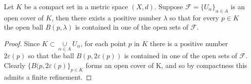\documentclass{article}
\begin{document}
\thm Let $K$ be a compact set in a metric space $(X,d)$. Suppose $\mathcal{F}=\{U_\alpha\}_{\alpha \in A}$ is an open cover of $K$, then there exists a positive number $\lambda$ so that for every $p \in K$ the open ball $B(p,\lambda)$ is contained in one of the open sets of $\mathcal{F}$.

\begin{proof}

Since $K \subset \underset{\alpha \in A}\cup U_\alpha$, for each point $p$ in $K$ there is a positive number $2\varepsilon(p)$ so that the ball $B(p,2\varepsilon(p))$ is contained in one of the open sets of $\mathcal{F}$. Clearly $\{B(p,2\varepsilon(p)\}_{p \in K}$ forms an open cover of K, and so by compactness this admits a finite refinement.

\end{proof}

\newpage


\end{document}
